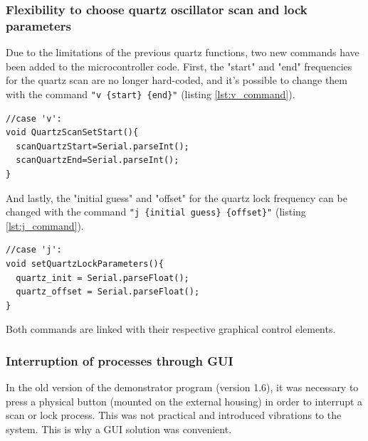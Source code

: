 \documentclass[a4paper,12pt]{article}
\begin{document}

\subsubsection{Flexibility to choose quartz oscillator scan and lock parameters}
\label{section:scan_params}

Due to the limitations of the previous quartz functions, two new commands have been added to the microcontroller code. First, the "start" and "end" frequencies for the quartz scan are no longer hard-coded, and it's possible to change them with the command \mbox{\texttt{"v \{start\} \{end\}"}} (listing \ref{lst:v_command}).

\begin{lstlisting}[style=c++,label={lst:v_command},caption={Command to change the quartz's scan parameters (file: mac.ino).},firstnumber=483]
//case 'v':
void QuartzScanSetStart(){
  scanQuartzStart=Serial.parseInt();
  scanQuartzEnd=Serial.parseInt();  
}
\end{lstlisting}

And lastly, the "initial guess" and "offset" for the quartz lock frequency can be changed with the command \mbox{\texttt{"j \{initial guess\} \{offset\}"}} (listing \ref{lst:j_command}).

\begin{lstlisting}[style=c++,label={lst:j_command},caption={Command to change the quartz's lock "initial guess" frequency (file: mac.ino).},firstnumber=472]
//case 'j':
void setQuartzLockParameters(){
  quartz_init = Serial.parseFloat();
  quartz_offset = Serial.parseFloat();
}
\end{lstlisting}

Both commands are linked with their respective graphical control elements.

\subsubsection{Interruption of processes through GUI}
\label{section:stop_process}

In the old version of the demonstrator program (version 1.6), it was necessary to press a physical button (mounted on the external housing) in order to interrupt a scan or lock process. This was not practical and introduced vibrations to the system. This is why a GUI solution was convenient.
\end{document}
